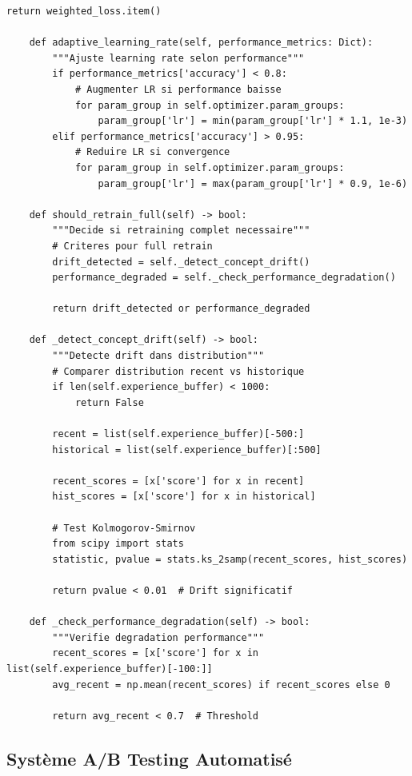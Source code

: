 \documentclass[12pt,a4paper]{article}
\begin{document}
\begin{lstlisting}[caption={Online Learning System}]
        return weighted_loss.item()
        
    def adaptive_learning_rate(self, performance_metrics: Dict):
        """Ajuste learning rate selon performance"""
        if performance_metrics['accuracy'] < 0.8:
            # Augmenter LR si performance baisse
            for param_group in self.optimizer.param_groups:
                param_group['lr'] = min(param_group['lr'] * 1.1, 1e-3)
        elif performance_metrics['accuracy'] > 0.95:
            # Reduire LR si convergence
            for param_group in self.optimizer.param_groups:
                param_group['lr'] = max(param_group['lr'] * 0.9, 1e-6)
                
    def should_retrain_full(self) -> bool:
        """Decide si retraining complet necessaire"""
        # Criteres pour full retrain
        drift_detected = self._detect_concept_drift()
        performance_degraded = self._check_performance_degradation()
        
        return drift_detected or performance_degraded
        
    def _detect_concept_drift(self) -> bool:
        """Detecte drift dans distribution"""
        # Comparer distribution recent vs historique
        if len(self.experience_buffer) < 1000:
            return False
            
        recent = list(self.experience_buffer)[-500:]
        historical = list(self.experience_buffer)[:500]
        
        recent_scores = [x['score'] for x in recent]
        hist_scores = [x['score'] for x in historical]
        
        # Test Kolmogorov-Smirnov
        from scipy import stats
        statistic, pvalue = stats.ks_2samp(recent_scores, hist_scores)
        
        return pvalue < 0.01  # Drift significatif
        
    def _check_performance_degradation(self) -> bool:
        """Verifie degradation performance"""
        recent_scores = [x['score'] for x in list(self.experience_buffer)[-100:]]
        avg_recent = np.mean(recent_scores) if recent_scores else 0
        
        return avg_recent < 0.7  # Threshold
\end{lstlisting}

\subsection{Système A/B Testing Automatisé}
\end{document}
